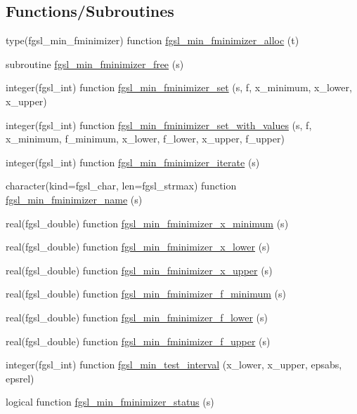 \subsection*{Functions/\+Subroutines}
\begin{DoxyCompactItemize}
\item 
type(fgsl\+\_\+min\+\_\+fminimizer) function \hyperlink{min_8finc_a97de5ab1b2ebed28f37cb39e68d37f8e}{fgsl\+\_\+min\+\_\+fminimizer\+\_\+alloc} (t)
\item 
subroutine \hyperlink{min_8finc_a16f5fcf8f532d2dfd847713e2eb365fd}{fgsl\+\_\+min\+\_\+fminimizer\+\_\+free} (s)
\item 
integer(fgsl\+\_\+int) function \hyperlink{min_8finc_aebda9dded327ca8921ee1cb2e670d505}{fgsl\+\_\+min\+\_\+fminimizer\+\_\+set} (s, f, x\+\_\+minimum, x\+\_\+lower, x\+\_\+upper)
\item 
integer(fgsl\+\_\+int) function \hyperlink{min_8finc_aad6cfe468d6d91f3b2116b2a6061d2fc}{fgsl\+\_\+min\+\_\+fminimizer\+\_\+set\+\_\+with\+\_\+values} (s, f, x\+\_\+minimum, f\+\_\+minimum, x\+\_\+lower, f\+\_\+lower, x\+\_\+upper, f\+\_\+upper)
\item 
integer(fgsl\+\_\+int) function \hyperlink{min_8finc_a5160e2c8eadc15b80784a0aca5554f3c}{fgsl\+\_\+min\+\_\+fminimizer\+\_\+iterate} (s)
\item 
character(kind=fgsl\+\_\+char, len=fgsl\+\_\+strmax) function \hyperlink{min_8finc_a3396297e9c77f8b4cd38c67566eac9be}{fgsl\+\_\+min\+\_\+fminimizer\+\_\+name} (s)
\item 
real(fgsl\+\_\+double) function \hyperlink{min_8finc_aa2755b3e3fbef70186fa48681f730638}{fgsl\+\_\+min\+\_\+fminimizer\+\_\+x\+\_\+minimum} (s)
\item 
real(fgsl\+\_\+double) function \hyperlink{min_8finc_a0ee7ec3329162025dc435e578a0bb0f1}{fgsl\+\_\+min\+\_\+fminimizer\+\_\+x\+\_\+lower} (s)
\item 
real(fgsl\+\_\+double) function \hyperlink{min_8finc_a06e4f2a2956710129e0c56bb8d2d1bc9}{fgsl\+\_\+min\+\_\+fminimizer\+\_\+x\+\_\+upper} (s)
\item 
real(fgsl\+\_\+double) function \hyperlink{min_8finc_ac68af52acc51b20808a6aa71d9eccdc7}{fgsl\+\_\+min\+\_\+fminimizer\+\_\+f\+\_\+minimum} (s)
\item 
real(fgsl\+\_\+double) function \hyperlink{min_8finc_a38b3ceaf7f12a7c9406314e9e410bbb4}{fgsl\+\_\+min\+\_\+fminimizer\+\_\+f\+\_\+lower} (s)
\item 
real(fgsl\+\_\+double) function \hyperlink{min_8finc_af552d34276a2d555cf91d53aaca8bbbc}{fgsl\+\_\+min\+\_\+fminimizer\+\_\+f\+\_\+upper} (s)
\item 
integer(fgsl\+\_\+int) function \hyperlink{min_8finc_a80d14f7331cae9ab0c66397d326bc3f8}{fgsl\+\_\+min\+\_\+test\+\_\+interval} (x\+\_\+lower, x\+\_\+upper, epsabs, epsrel)
\item 
logical function \hyperlink{min_8finc_ab663e2a33741f94ed117ca1d743f2390}{fgsl\+\_\+min\+\_\+fminimizer\+\_\+status} (s)
\end{DoxyCompactItemize}


